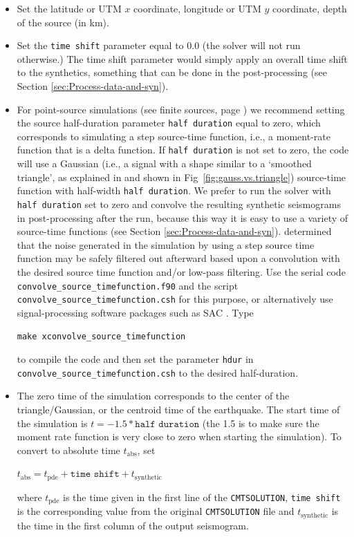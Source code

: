 \begin{itemize}
\item Set the latitude or UTM $x$ coordinate, longitude or UTM $y$ coordinate, depth of the source (in km).
\item Set the \texttt{time shift} parameter equal to $0.0$ (the solver
will not run otherwise.) The time shift parameter would simply apply
an overall time shift to the synthetics, something that can be done
in the post-processing (see Section \ref{sec:Process-data-and-syn}).
\item For point-source simulations (see finite sources, page \pageref{To-simulate-a})
we recommend setting the source half-duration parameter \texttt{half
duration} equal to zero, which corresponds to simulating a step source-time
function, i.e., a moment-rate function that is a delta function. If
\texttt{half duration} is not set to zero, the code will use a Gaussian
(i.e., a signal with a shape similar to a `smoothed triangle', as
explained in \citet{KoTr02a} and shown in Fig~\ref{fig:gauss.vs.triangle})
source-time function with half-width \texttt{half duration}. We prefer
to run the solver with \texttt{half duration} set to zero and convolve
the resulting synthetic seismograms in post-processing after the run,
because this way it is easy to use a variety of source-time functions
(see Section \ref{sec:Process-data-and-syn}). \citet{KoTr02a} determined
that the noise generated in the simulation by using a step source
time function may be safely filtered out afterward based upon a convolution
with the desired source time function and/or low-pass filtering. Use
the serial code \texttt{convolve\_source\_timefunction.f90} and the
script \texttt{convolve\_source\_timefunction.csh} for this purpose,
or alternatively use signal-processing software packages such as SAC
. Type
{\small
\begin{verbatim}
make xconvolve_source_timefunction
\end{verbatim}
}
to compile the code and then set the parameter \texttt{hdur} in \texttt{convolve\_source\_timefunction.csh}
to the desired half-duration.

\item The zero time of the simulation corresponds to the center of the triangle/Gaussian,
or the centroid time of the earthquake. The start time of the simulation
is $t=-1.5*\texttt{half duration}$ (the 1.5 is to make sure the moment
rate function is very close to zero when starting the simulation).
To convert to absolute time $t_{\mathrm{abs}}$, set
%
\begin{lyxcode}
$t_{\mathrm{abs}}=t_{\mathrm{pde}}+\texttt{time shift}+t_{\mathrm{synthetic}}$
\end{lyxcode}

where $t_{\mathrm{pde}}$ is the time given in the first line of the
\texttt{CMTSOLUTION}, \texttt{time shift} is the corresponding value
from the original \texttt{CMTSOLUTION} file and $t_{\mathrm{synthetic}}$
is the time in the first column of the output seismogram.
\end{itemize}
